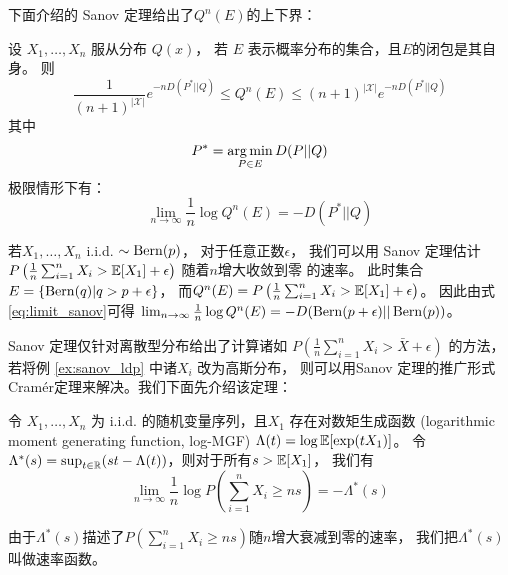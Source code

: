 下面介绍的 Sanov 定理给出了$Q^n(E)$的上下界：
\begin{theorem}
  设 $X_1, \dots, X_n$  服从分布 $Q(x)$，
  若 $E$ 表示概率分布的集合，且$E$的闭包是其自身。
  则
  \begin{equation}
  \frac{1}{(n+1)^{|\mathcal{X}|}} e^{-n D(P^*||Q)}
  \leq Q^n(E) \leq (n+1)^{|\mathcal{X}|} e^{-n D(P^*||Q)}
  \end{equation}
  其中
  \begin{equation}
    P^* = \operatorname*{arg\,min}_{P\in E} D(P||Q)
  \end{equation}
  极限情形下有：
  \begin{equation}\label{eq:limit_sanov}
    \lim_{n\to \infty} \frac{1}{n} \log Q^n(E) = -D(P^*||Q)
  \end{equation}
\end{theorem}
\begin{example}\label{ex:sanov_ldp}
若$X_1, \dots, X_n$ i.i.d. $\sim \operatorname{Bern}(p)$，
对于任意正数$\epsilon$，
我们可以用 Sanov 定理估计 $P\left(
  \frac{1}{n} \sum_{i=1}^n X_i > \operatorname{\mathbb{E}}[X_1] + \epsilon
  \right)$ 随着$n$增大收敛到零
的速率。
此时集合$E=\{\operatorname{Bern}(q)| q>p+\epsilon\}$，
而$Q^n(E)=
P\left(\frac{1}{n} \sum_{i=1}^n X_i > \operatorname{\mathbb{E}}[X_1] + \epsilon \right)$。
因此由式\eqref{eq:limit_sanov}可得
$\lim_{n\to \infty} \frac{1}{n} \log Q^n(E)=-D(\operatorname{Bern}(p+\epsilon)||\operatorname{Bern}(p))$。
\end{example}
Sanov 定理仅针对离散型分布给出了计算诸如
$P\left(\frac{1}{n} \sum_{i=1}^n X_i > \bar{X} + \epsilon \right)$
的方法，若将例 \ref{ex:sanov_ldp} 中诸$X_i$ 改为高斯分布，
则可以用Sanov 定理的推广形式 Cramér定理来解决。我们下面先介绍该定理：

\begin{theorem}\label{thm:cramer}
  令 $X_1, \dots, X_n$ 为 i.i.d. 的随机变量序列，且$X_1$ 存在对数矩生成函数 (logarithmic moment generating function, log-MGF)
$\Lambda(t)=\log \operatorname{\mathbb{E}}[\exp(t X_1)]$。
令 $\Lambda^*(s)= \sup_{t \in \mathbb{R}} (st-\Lambda(t))$，则对于所有$s>\operatorname{\mathbb{E}}[X_1]$，
我们有
\begin{equation}\label{eq:cramer}
\lim_{n\to \infty} \frac{1}{n}\log P\left(
  \sum_{i=1}^n X_i \geq  ns \right) = - \Lambda^*(s)
\end{equation}
\end{theorem}
由于$\Lambda^*(s)$描述了$P( \sum_{i=1}^n X_i \geq  ns)$随$n$增大衰减到零的速率，
我们把$\Lambda^*(s)$叫做速率函数。

